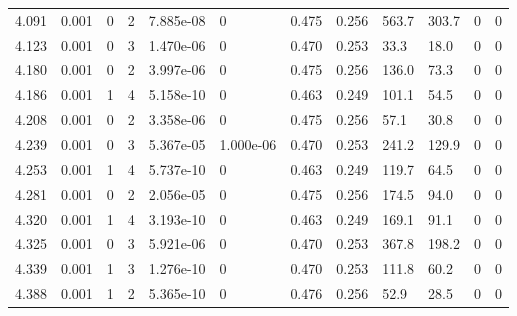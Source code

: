 \documentclass[preview]{standalone}
\begin{document}
{{{{{\begin{tabular}{L{1.2cm}C{1.2cm} C{0.3cm}C{0.5cm} C{1.4cm}C{1.4cm} C{1.4cm}C{1.4cm} C{1.6cm}C{1.6cm} C{1.6cm}C{1.6cm}}
  4.091  &  0.001  & 0     &  2 &  7.885e-08  & 0  &  0.475&   0.256& 563.7 & 303.7   &  0 & 0  \\ 
  4.123  &  0.001  & 0     &  3 &  1.470e-06  & 0  &  0.470&   0.253& 33.3 & 18.0   &  0 & 0  \\ 
  4.180  &  0.001  & 0     &  2 &  3.997e-06  & 0  &  0.475&   0.256& 136.0 & 73.3   &  0 & 0  \\ 
  4.186  &  0.001  & 1     &  4 &  5.158e-10  & 0  &  0.463&   0.249& 101.1 & 54.5   &  0 & 0  \\ 
  4.208  &  0.001  & 0     &  2 &  3.358e-06  & 0  &  0.475&   0.256& 57.1 & 30.8   &  0 & 0  \\ 
  4.239  &  0.001  & 0     &  3 &  5.367e-05  & 1.000e-06  &  0.470&   0.253& 241.2 & 129.9   &  0 & 0  \\ 
  4.253  &  0.001  & 1     &  4 &  5.737e-10  & 0  &  0.463&   0.249& 119.7 & 64.5   &  0 & 0  \\ 
  4.281  &  0.001  & 0     &  2 &  2.056e-05  & 0  &  0.475&   0.256& 174.5 & 94.0   &  0 & 0  \\ 
  4.320  &  0.001  & 1     &  4 &  3.193e-10  & 0  &  0.463&   0.249& 169.1 & 91.1   &  0 & 0  \\ 
  4.325  &  0.001  & 0     &  3 &  5.921e-06  & 0  &  0.470&   0.253& 367.8 & 198.2   &  0 & 0  \\ 
  4.339  &  0.001  & 1     &  3 &  1.276e-10  & 0  &  0.470&   0.253& 111.8 & 60.2   &  0 & 0  \\ 
  4.388  &  0.001  & 1     &  2 &  5.365e-10  & 0  &  0.476&   0.256& 52.9 & 28.5   &  0 & 0  \\ 
\hline 
\end{tabular} 

}}}}}
\end{document}
